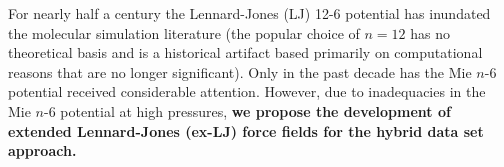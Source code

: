 \documentclass[12pt,a4paper]{article}
\begin{document}








For nearly half a century the Lennard-Jones (LJ) 12-6 potential has inundated the molecular simulation literature (the popular choice of $n=12$ has no theoretical basis and is a historical artifact based primarily on computational reasons that are no longer significant). Only in the past decade has the Mie $n$-6 potential received considerable attention. However, due to inadequacies in the Mie $n$-6 potential at high pressures, \textbf{we propose the development of extended Lennard-Jones (ex-LJ) force fields for the hybrid data set approach.} 
\end{document}
